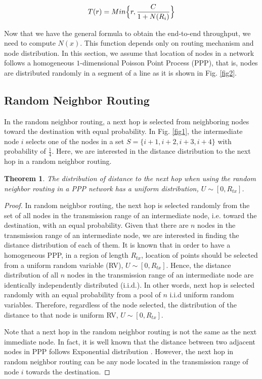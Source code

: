 \documentclass[12pt, draftclsnofoot, onecolumn]{IEEEtran}
\newtheorem{theorem}{Theorem}[section]
\begin{document}
\begin{equation}
T(r) = Min \Bigl\{ r,\frac{C}{1+N(R_i)} \Bigr\}
\label{BaseFomula}
\end{equation}

 
Now that we have the general formula to obtain the end-to-end throughput,
we need to compute $N(x)$. This function depends only on routing mechanism 
and node distribution. In this section, we assume that location of nodes in a network follows a 
homogeneous $1$-dimensional Poisson Point Process (PPP), that is, nodes are distributed randomly in a segment of a line as it is shown 
in Fig. \ref{fig2}. 

\subsection{Random Neighbor Routing}

In the random neighbor routing, a next hop is selected from neighboring 
nodes toward the destination with equal probability. In Fig. \ref{fig1}, 
the intermediate node $i$ selects one of the nodes in a set 
$S=\{i+1,i+2,i+3,i+4\}$ with probability of $\frac{1}{4}$. Here, we 
are interested in the distance distribution  to the next hop in 
a random neighbor routing.

\begin{theorem}
The distribution of distance to the next hop when using the random neighbor 
routing in a PPP network has a uniform distribution, $U{\sim}[0,R_{tx}]$.
\end{theorem}

\begin{proof}
In random neighbor routing, the next hop is selected randomly 
from the set of all nodes in the transmission range of an intermediate 
node, i.e. toward the destination, with an equal probability. Given that 
there are $n$ nodes in the transmission range of an intermediate node, 
we are interested in finding the distance distribution of each of them. 
It is known \cite{ppp} that in order to have a homogeneous PPP, in a 
region of length $R_{tx}$, location of points should be selected from a 
uniform random variable (RV), $U{\sim}[0,R_{tx}]$. Hence, the distance distribution of 
all $n$ nodes in the transmission range of an intermediate node are 
identically independently distributed (i.i.d.).
In other words, next hop is selected randomly with an equal probability 
from a pool of $n$ i.i.d uniform random variables. Therefore, regardless of 
the node selected, the distribution of the distance to that node is uniform 
RV, $U{\sim}[0,R_{tx}]$.

Note that a next hop in the random neighbor routing is not the same as the next immediate node. In fact, it is well known that the distance between 
two adjacent nodes in PPP follows Exponential distribution \cite{ppp}. However, the next hop in random neighbor routing can be any node located in the transmission range of node $i$ towards the destination.
\end{proof} 
\end{document}
